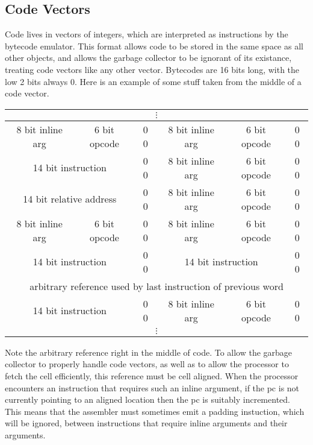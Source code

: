 \subsection{Code Vectors} \label{sec:codeblock}

Code lives in vectors of integers, which are interpreted as
instructions by the bytecode emulator.  This format allows code to be
stored in the same space as all other objects, and allows the garbage
collector to be ignorant of its existance, treating code vectors like
any other vector.  Bytecodes are 16 bits long, with the low 2 bits
always 0.  Here is an example of some stuff taken from the middle of a
code vector.

\begin{center}
\begin{tabular}{|c|c|c|c|c|c|}
\multicolumn{6}{|c|}{$\vdots$}\\\hline
8 bit inline arg & 6 bit opcode & 0 0 &
8 bit inline arg & 6 bit opcode & 0 0 \\\hline
\multicolumn{2}{|c|}{14 bit instruction} & 0 0 &
8 bit inline arg & 6 bit opcode & 0 0 \\\hline
\multicolumn{2}{|c|}{14 bit relative address} & 0 0 &
8 bit inline arg & 6 bit opcode & 0 0 \\\hline
8 bit inline arg & 6 bit opcode & 0 0 &
8 bit inline arg & 6 bit opcode & 0 0 \\\hline
\multicolumn{2}{|c|}{14 bit instruction} & 0 0 &
\multicolumn{2}{c|}{14 bit instruction} & 0 0 \\\hline
\multicolumn{6}{|c|}{arbitrary reference used by last instruction of
 previous word} \\\hline
\multicolumn{2}{|c|}{14 bit instruction} & 0 0 &
8 bit inline arg & 6 bit opcode & 0 0 \\\hline
\multicolumn{6}{|c|}{$\vdots$}
\end{tabular}
\end{center}

Note the arbitrary reference right in the middle of code.  To allow
the garbage collector to properly handle code vectors, as well as to
allow the processor to fetch the cell efficiently, this reference must
be cell aligned.  When the processor encounters an instruction that
requires such an inline argument, if the pc is not currently pointing
to an aligned location then the pc is suitably incremented.  This
means that the assembler must sometimes emit a padding instuction,
which will be ignored, between instructions that require inline
arguments and their arguments.

